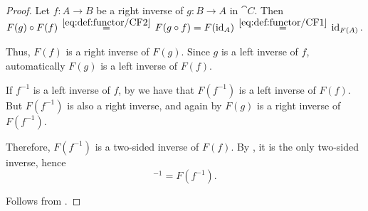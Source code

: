 \begin{proof}
   Let \( f: A \to B \) be a right inverse of \( g: B \to A \) in \( \cat{C} \). Then
  \begin{equation*}
    F(g) \bincirc F(f)
    \reloset {\eqref{eq:def:functor/CF2}} =
    F(g \bincirc f)
    =
    F(\id_A)
    \reloset {\eqref{eq:def:functor/CF1}} =
    \id_{F(A)}.
  \end{equation*}

  Thus, \( F(f) \) is a right inverse of \( F(g) \). Since \( g \) is a left inverse of \( f \), automatically \( F(g) \) is a left inverse of \( F(f) \).

   If \( f^{-1} \) is a left inverse of \( f \), by  we have that \( F(f^{-1}) \) is a left inverse of \( F(f) \). But \( F(f^{-1}) \) is also a right inverse, and again by  \( F(g) \) is a right inverse of \( F(f^{-1}) \).

  Therefore, \( F(f^{-1}) \) is a two-sided inverse of \( F(f) \). By , it is the only two-sided inverse, hence
  \begin{equation*}
    [F(f)]^{-1} = F(f^{-1}).
  \end{equation*}

   Follows from .
\end{proof}

